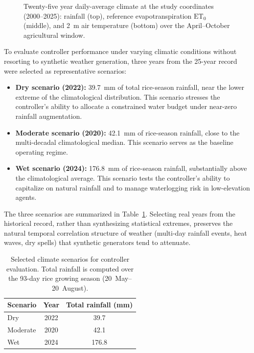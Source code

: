 \begin{figure}[h]
\centering
\caption{Twenty-five year daily-average climate at the study coordinates
(2000--2025): rainfall (top), reference evapotranspiration $\mathrm{ET}_0$
(middle), and 2~m air temperature (bottom) over the
April--October agricultural window.}
\label{fig:climatology}
\end{figure}

To evaluate controller performance under varying climatic conditions
without resorting to synthetic weather generation, three years from the
25-year record were selected as representative scenarios:
\begin{itemize}
\item \textbf{Dry scenario (2022):} 39.7~mm of total rice-season rainfall,
near the lower extreme of the climatological distribution. This scenario
stresses the controller's ability to allocate a constrained water budget
under near-zero rainfall augmentation.
\item \textbf{Moderate scenario (2020):} 42.1~mm of rice-season rainfall,
close to the multi-decadal climatological median. This scenario serves
as the baseline operating regime.
\item \textbf{Wet scenario (2024):} 176.8~mm of rice-season rainfall,
substantially above the climatological average. This scenario tests the
controller's ability to capitalize on natural rainfall and to manage
waterlogging risk in low-elevation agents.
\end{itemize}

The three scenarios are summarized in Table~\ref{tab:scenarios}. Selecting
real years from the historical record, rather than synthesizing
statistical extremes, preserves the natural temporal correlation
structure of weather (multi-day rainfall events, heat waves, dry spells)
that synthetic generators tend to attenuate.

\begin{table}[h]
\centering
\caption{Selected climate scenarios for controller evaluation. Total
rainfall is computed over the 93-day rice growing season
(20~May--20~August).}
\label{tab:scenarios}
\begin{tabular}{lcc}
\toprule
\textbf{Scenario} & \textbf{Year} & \textbf{Total rainfall (mm)} \\
\midrule
Dry      & 2022 & 39.7 \\
Moderate & 2020 & 42.1 \\
Wet      & 2024 & 176.8 \\
\bottomrule
\end{tabular}
\end{table}

